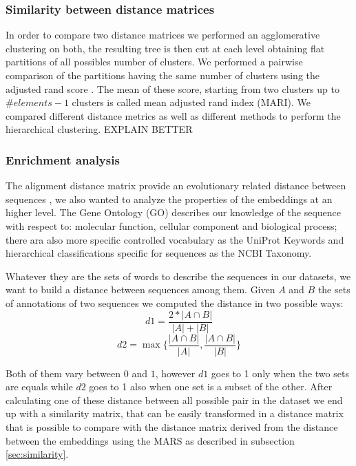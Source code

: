 \documentclass[12pt, letterpaper, twocolumn]{article}
\begin{document}
\subsubsection{Similarity between distance matrices \label{sec:similarity}}
In order to compare two distance matrices we performed an agglomerative clustering on both, the resulting tree is then cut at each level obtaining flat partitions of all possibles number of clusters. We performed a pairwise comparison of the partitions having the same number of clusters using the adjusted rand score \cite{hubert1985comparing}. The mean of these score, starting from two clusters up to $ \#elements - 1 $ clusters is called mean adjusted rand index (MARI). We compared different distance metrics as well as different methods to perform the hierarchical clustering.  EXPLAIN BETTER

\subsubsection{Enrichment analysis}
The alignment distance matrix provide an evolutionary related distance between sequences \cite{SOFI202247}, we also wanted to analyze the properties of the embeddings at an higher level. The Gene Ontology (GO) describes our knowledge of the sequence with respect to: molecular function, cellular component and biological process; there ara also more specific controlled vocabulary as the UniProt Keywords and hierarchical classifications specific for sequences as the NCBI Taxonomy.

Whatever they are the sets of words to describe the sequences in our datasets, we want to build a distance between sequences among them. Given $A$ and $B$ the sets of annotations of two sequences we computed the distance in two possible ways: $$d1 = \frac{2 * |A \cap B|}{|A| + |B|} $$ $$d2 = \max\{ \frac{|A \cap B|}{|A|}, \frac{|A \cap B|}{|B|} \} $$

Both of them vary between $0$ and $1$, however $d1$ goes to 1 only when the two sets are equals while $d2$ goes to 1 also when one set is a subset of the other. After calculating one of these distance between all possible pair in the dataset we end up with a similarity matrix, that can be easily transformed in a distance matrix that is possible to compare with the distance matrix derived from the distance between the embeddings using the MARS as described in subsection \ref{sec:similarity}.
\end{document}
